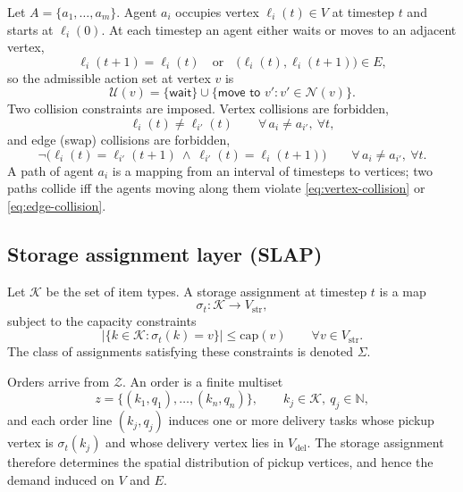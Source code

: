 Let \( A = \{a_1, \dots, a_m\} \). Agent \( a_i \) occupies vertex
\( \ell_i(t) \in V \) at timestep \( t \) and starts at \( \ell_i(0) \). At
each timestep an agent either waits or moves to an adjacent vertex,
\begin{equation}
  \ell_i(t+1) = \ell_i(t)
  \quad \text{or} \quad
  \big(\ell_i(t), \ell_i(t+1)\big) \in E ,
\end{equation}
so the admissible action set at vertex \( v \) is
\begin{equation}
  \mathcal{U}(v) = \{\textsf{wait}\} \cup \{ \textsf{move to } v' : v' \in \mathcal{N}(v) \}.
\end{equation}
Two collision constraints are imposed. Vertex collisions are forbidden,
\begin{equation}
  \ell_i(t) \neq \ell_{i'}(t)
  \qquad \forall\, a_i \neq a_{i'},\ \forall t,
  \label{eq:vertex-collision}
\end{equation}
and edge (swap) collisions are forbidden,
\begin{equation}
  \neg \big( \ell_i(t) = \ell_{i'}(t+1) \ \wedge\ \ell_{i'}(t) = \ell_i(t+1) \big)
  \qquad \forall\, a_i \neq a_{i'},\ \forall t.
  \label{eq:edge-collision}
\end{equation}
A path of agent \( a_i \) is a mapping from an interval of timesteps to
vertices; two paths collide iff the agents moving along them violate
\eqref{eq:vertex-collision} or \eqref{eq:edge-collision}.

\subsection{Storage assignment layer (SLAP)}

Let \( \mathcal{K} \) be the set of item types. A storage assignment at
timestep \( t \) is a map
\begin{equation}
  \sigma_t : \mathcal{K} \to V_{\mathrm{str}},
\end{equation}
subject to the capacity constraints
\begin{equation}
  \big| \{ k \in \mathcal{K} : \sigma_t(k) = v \} \big| \leq \mathrm{cap}(v)
  \qquad \forall v \in V_{\mathrm{str}} .
\end{equation}
The class of assignments satisfying these constraints is denoted \( \Sigma \).

Orders arrive from \( \mathcal{Z} \). An order is a finite multiset
\begin{equation}
  z = \{ (k_1, q_1), \dots, (k_n, q_n) \}, \qquad k_j \in \mathcal{K},\ q_j \in \mathbb{N},
\end{equation}
and each order line \( (k_j, q_j) \) induces one or more delivery tasks whose
pickup vertex is \( \sigma_t(k_j) \) and whose delivery vertex lies in
\( V_{\mathrm{del}} \). The storage assignment therefore determines the
spatial distribution of pickup vertices, and hence the demand induced on
\( V \) and \( E \).

